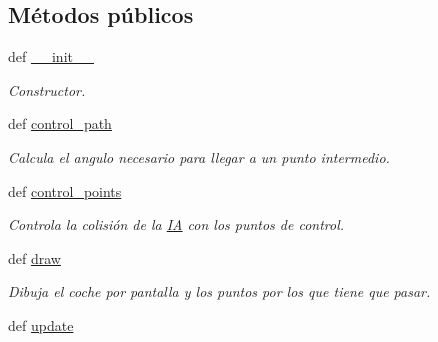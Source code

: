 \subsection*{\-Métodos públicos}
\begin{DoxyCompactItemize}
\item 
def \hyperlink{classengine_1_1ia_1_1IA_a6a7bcf0f66846ed63b23ae60e889e8d3}{\-\_\-\-\_\-init\-\_\-\-\_\-}
\begin{DoxyCompactList}\small\item\em \-Constructor. \end{DoxyCompactList}\item 
\hypertarget{classengine_1_1ia_1_1IA_a6e2a6b8fdc9972ef364a0ecd9ceaadb8}{
def \hyperlink{classengine_1_1ia_1_1IA_a6e2a6b8fdc9972ef364a0ecd9ceaadb8}{control\-\_\-path}}
\label{classengine_1_1ia_1_1IA_a6e2a6b8fdc9972ef364a0ecd9ceaadb8}

\begin{DoxyCompactList}\small\item\em \-Calcula el angulo necesario para llegar a un punto intermedio. \end{DoxyCompactList}\item 
\hypertarget{classengine_1_1ia_1_1IA_abb76fab4bb7d45bfe172180374686007}{
def \hyperlink{classengine_1_1ia_1_1IA_abb76fab4bb7d45bfe172180374686007}{control\-\_\-points}}
\label{classengine_1_1ia_1_1IA_abb76fab4bb7d45bfe172180374686007}

\begin{DoxyCompactList}\small\item\em \-Controla la colisión de la \hyperlink{classengine_1_1ia_1_1IA}{\-I\-A} con los puntos de control. \end{DoxyCompactList}\item 
\hypertarget{classengine_1_1ia_1_1IA_a35fae86a9ec301c40e0a2a94f41ed894}{
def \hyperlink{classengine_1_1ia_1_1IA_a35fae86a9ec301c40e0a2a94f41ed894}{draw}}
\label{classengine_1_1ia_1_1IA_a35fae86a9ec301c40e0a2a94f41ed894}

\begin{DoxyCompactList}\small\item\em \-Dibuja el coche por pantalla y los puntos por los que tiene que pasar. \end{DoxyCompactList}\item 
\hypertarget{classengine_1_1ia_1_1IA_a112d2ade5b420430c3a8dbce234350bd}{
def \hyperlink{classengine_1_1ia_1_1IA_a112d2ade5b420430c3a8dbce234350bd}{update}}
\label{classengine_1_1ia_1_1IA_a112d2ade5b420430c3a8dbce234350bd}


\end{DoxyCompactItemize}
